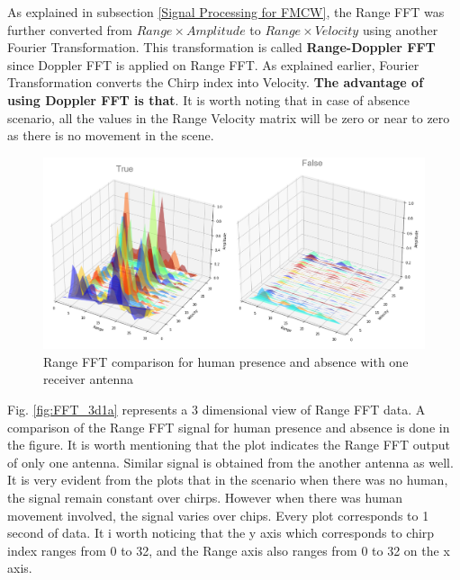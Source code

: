 As explained in subsection \ref{Signal Processing for FMCW}, the Range FFT was further converted from $Range\times Amplitude$ to $Range\times Velocity$ using another Fourier Transformation. This transformation is called \textbf{Range-Doppler FFT} since Doppler FFT is applied on Range FFT. As explained earlier, Fourier Transformation converts the Chirp index into Velocity. \textbf{The advantage of using Doppler FFT is that}. It is worth noting that in case of absence scenario, all the values in the Range Velocity matrix will be zero or near to zero as there is no movement in the scene.
\begin{figure}[ht]
  \begin{center}
    \includegraphics[width=1\textwidth]{Master's thesis/images/2ndFFT.PNG} 
    \caption{Range FFT comparison for human presence and absence with one receiver antenna}
    \label{fig:rdFFT_3d1a}
  \end{center}
\end{figure} 
Fig. \ref{fig:FFT_3d1a} represents a 3 dimensional view of Range FFT data. A comparison of the Range FFT signal for human presence and absence is done in the figure. It is worth mentioning that the plot indicates the Range FFT output of only one antenna. Similar signal is obtained from the another antenna as well. 
It is very evident from the plots that in the scenario when there was no human, the signal remain constant over chirps. However when there was human movement involved, the signal varies over chips. Every plot corresponds to 1 second of data. It i worth noticing that the y axis which corresponds to chirp index ranges from 0 to 32, and the Range axis also ranges from 0 to 32 on the x axis.

